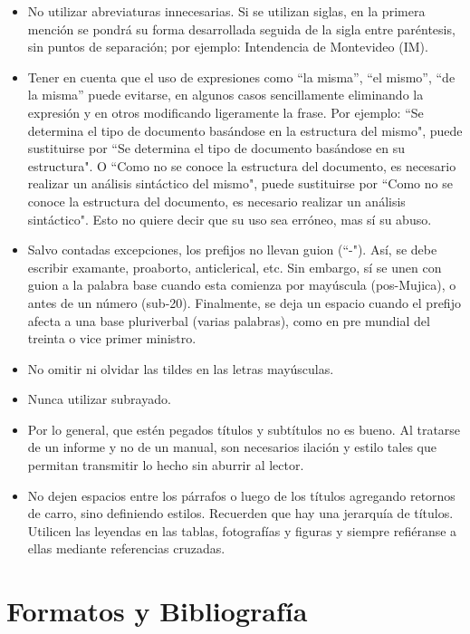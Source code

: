 \documentclass[journal,onecolumn]{IEEEtran}
\begin{document}
\begin{itemize}
	\item No utilizar abreviaturas innecesarias. Si se utilizan siglas, en la primera mención se pondrá su forma desarrollada seguida de la sigla entre paréntesis, sin puntos de separación; por ejemplo: Intendencia de Montevideo (IM).
	
	\item Tener en cuenta que el uso de expresiones como ``la misma'', ``el mismo'', ``de la misma'' puede evitarse, en algunos casos sencillamente eliminando la expresión y en otros modificando ligeramente la frase. Por ejemplo: ``Se determina el tipo de documento basándose en la estructura del mismo", puede sustituirse por ``Se determina el tipo de documento basándose en su estructura". O ``Como no se conoce la estructura del documento, es necesario realizar un análisis sintáctico del mismo", puede sustituirse por ``Como no se conoce la estructura del documento, es necesario realizar un análisis sintáctico". Esto no quiere decir que su uso sea erróneo, mas sí su abuso.
	
	\item Salvo contadas excepciones, los prefijos no llevan guion (``-"). Así, se debe escribir examante, proaborto, anticlerical, etc. Sin embargo, sí se unen con guion a la palabra base cuando esta comienza por mayúscula (pos-Mujica), o antes de un número (sub-20). Finalmente, se deja un espacio cuando el prefijo afecta a una base pluriverbal (varias palabras), como en pre mundial del treinta o vice primer ministro.
	
	\item No omitir ni olvidar las tildes en las letras mayúsculas.
	
	\item Nunca utilizar subrayado.
	
	\item Por lo general, que estén pegados títulos y subtítulos no es bueno. Al tratarse de un informe y no de un manual, son necesarios ilación y estilo tales que permitan transmitir lo hecho sin aburrir al lector.
	
	\item No dejen espacios entre los párrafos o luego de los títulos agregando retornos de carro, sino definiendo estilos. Recuerden que hay una jerarquía de títulos. Utilicen las leyendas en las tablas, fotografías y figuras y siempre refiéranse a ellas mediante referencias cruzadas. 
	
	
\end{itemize}


\section{Formatos y Bibliografía}
\label{formato}
\end{document}

